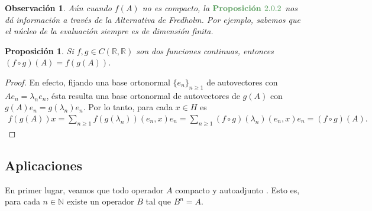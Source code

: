 \documentclass[11pt]{report}
\theoremstyle{colored}
\newtheorem{proposition}{Proposición}[section]
\newtheorem{remark}{Observación}[section]
\newcommand{\N}{\mathbb{N}}
\newcommand{\R}{\mathbb{R}}
\newcommand{\paint}[1]{\color{color}{#1}}
\newcommand{\tpaint}[1]{\paint{\textbf{#1}}}
\begin{document}
\begin{remark} Aún cuando $f(A)$ no es compacto, la $\tpaint{Proposición }2.0.2$ nos dá información a través de la Alternativa de Fredholm. Por ejemplo, sabemos que el núcleo de la evaluación siempre es de dimensión finita.
\end{remark}

\begin{proposition} Si $f,g \in C(\R,\R)$ son dos funciones continuas, entonces $(f \circ g)(A) = f(g(A))$.
\end{proposition}
\begin{proof} En efecto, fijando una base ortonormal $\{e_n\}_{n \geq 1}$ de autovectores con $Ae_n = \lambda_ne_n$, ésta resulta una base ortonormal de autovectores de $g(A)$ con $g(A)e_n = g(\lambda_n)e_n$. Por lo tanto, para cada $x \in H$ es
\begin{align*}
f(g(A))x = \sum_{n \geq 1}f(g(\lambda_n))(e_n,x)e_n = \sum_{n \geq 1}(f \circ g)(\lambda_n)(e_n,x)e_n = (f \circ g)(A).
\end{align*}
\end{proof}

\subsection{Aplicaciones}

En primer lugar, veamos que todo operador $A$ compacto y autoadjunto . Esto es, para cada $n \in \N$ existe un operador $B$ tal que $B^n = A$.
\end{document}

